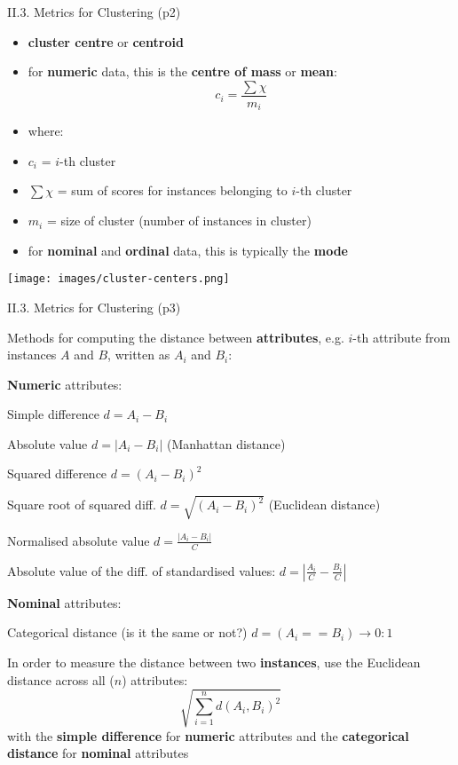 \documentclass[handout]{beamer}
\newcommand{\strong}[1]{\textbf{\color{teal} #1}}
\newcommand{\stronger}[1]{\textbf{\color{purple} #1}}
\begin{document}
\begin{frame}{II.3. Metrics for Clustering (p2)}
\begin{itemize}
\item \stronger{cluster centre} or \stronger{centroid}
\item for \strong{numeric} data, this is the \strong{centre of mass} or \strong{mean}:\\
\[
c_i = \frac{\sum{\chi}}{m_i}
\]
\item[] where:
\item[] $c_i$ = $i$-th cluster
\item[] $\sum{\chi}$ = sum of scores for instances belonging to $i$-th cluster
\item[] $m_i$ = size of cluster (number of instances in cluster)
\item for \strong{nominal} and \strong{ordinal} data, this is typically the \stronger{mode}
\end{itemize}
\begin{center}
\texttt{[image: images/cluster-centers.png]}
\end{center}
\end{frame}
\begin{frame}{II.3. Metrics for Clustering (p3)}
\begin{itemize}
\item[] Methods for computing the distance between \strong{attributes}, e.g. $i$-th attribute from instances $A$ and $B$, written as $A_i$ and $B_i$:
%
\item \strong{Numeric} attributes:
{\footnotesize
\item[$\bullet$] Simple difference $d=A_i-B_i$
\item[$\bullet$] Absolute value $d=|A_i-B_i|$ {\scriptsize (Manhattan distance)}
\item[$\bullet$] Squared difference $d=(A_i-B_i)^2$
\item[$\bullet$] Square root of squared diff. $d=\sqrt{(A_i-B_i)^2}$ {\scriptsize (Euclidean distance)}
\item[$\bullet$] Normalised absolute value $d=\frac{|A_i-B_i|}{C}$
\item[$\bullet$] Absolute value of the diff. of standardised values: 
$d=|\frac{A_i}{C} - \frac{B_i}{C}|$
}
%
\item \strong{Nominal} attributes:
{\footnotesize
\item[$\bullet$] Categorical distance (is it the same or not?)
	${ d=(A_i==B_i) \rightarrow 0 : 1 }$
}
%
{\footnotesize
\item In order to measure the distance between two \strong{instances}, use the Euclidean distance across all ($n$) attributes:
\[
	\sqrt{ \sum_{i=1}^n d( A_i, B_i )^2 }
\]
with the \textbf{simple difference} for \strong{numeric} attributes and the \textbf{categorical distance} for \strong{nominal} attributes
}
\end{itemize}
\end{frame}
\end{document}
